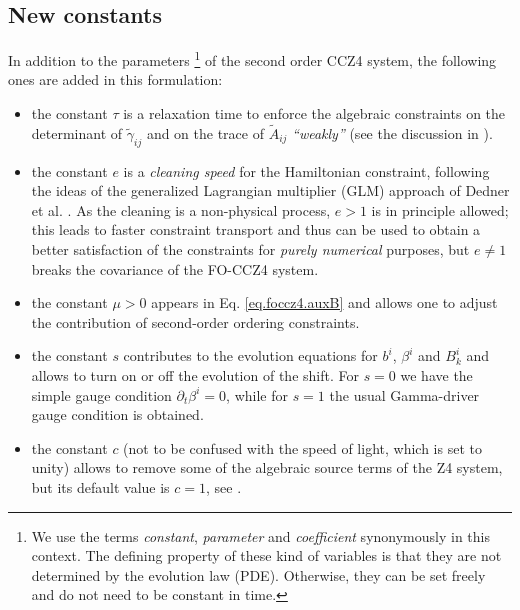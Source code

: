 \subsection*{New constants}
In addition to the parameters \footnote{
	We use the terms \emph{constant}, \emph{parameter} and
	\emph{coefficient} synonymously in this context. The defining property
	of these kind of variables is that they are not determined by the
	evolution law (PDE). Otherwise, they can be set freely and do not
	need to be constant in time.
}
of the second order CCZ4 system, the
following ones are added in this formulation: 
%
\begin{itemize}
%
\item the constant $\tau$ is a relaxation time to enforce the algebraic
  constraints on the determinant of $\tilde{\gamma}_{ij}$ and on the
  trace of $\tilde{A}_{ij}$ \textit{``weakly''} (see the discussion in
  \cite{Alic:2011a}).
%
\item the constant $e$ is a \textit{cleaning speed} for the Hamiltonian
  constraint, following the ideas of the generalized Lagrangian
  multiplier (GLM) approach of Dedner et al. \cite{Dedner:2002}. As the
  cleaning is a non-physical process, $e > 1$ is in principle allowed;
  this leads to faster constraint transport and thus can be used to
  obtain a better satisfaction of the constraints for \textit{purely
    numerical} purposes, but $e \neq 1$ breaks the covariance of the
  FO-CCZ4 system.

\item the constant $\mu>0$ appears in Eq. \eqref{eq.foccz4.auxB} and allows 
one to
  adjust the contribution of second-order ordering constraints.

\item the constant $s$ contributes to the evolution equations for $b^i$,
  $\beta^i$ and $B^i_k$ and allows to turn on or off the evolution of the
  shift. For $s=0$ we have the simple gauge condition $\partial_t \beta^i
  = 0$, while for $s=1$ the usual Gamma-driver gauge condition is
  obtained.

\item the constant $c$ (not to be confused with the speed of light, which
  is set to unity) allows to remove some of the algebraic source terms of
  the Z4 system, but its default value is $c=1$, see \cite{Alic:2011a}. 


\end{itemize}
